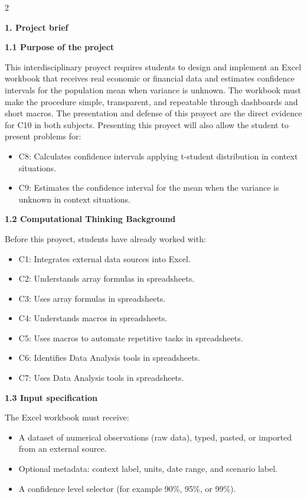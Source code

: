 \documentclass[12pt]{article}
\newcommand{\SubsectionBox}[1]{%
	\noindent\colorbox{gray!30}{%
		\parbox{\linewidth}{\textbf{#1}}%
	}\par\vspace{0.35cm}%
}
\begin{document}
	\vspace{0.4cm}
	
	\begin{multicols}{2}
		
		\vspace{0.25cm}
		\SubsectionBox{1. Project brief}\vspace{-0.25cm}
		
		\textbf{1.1 Purpose of the project}\par
		This interdisciplinary proyect requires students to design and implement an Excel workbook that receives real economic or financial data and estimates confidence intervals for the population mean when variance is unknown.
		The workbook must make the procedure simple, transparent, and repeatable through dashboards and short macros.
		The presentation and defense of this proyect are the direct evidence for C10 in both subjects.
		Presenting this proyect will also allow the student to present problems for:
		\begin{itemize}
			\item C8: Calculates confidence intervals applying t-student distribution in context situations.
			\item C9: Estimates the confidence interval for the mean when the variance is unknown in context situations.
		\end{itemize}
		
		\textbf{1.2 Computational Thinking Background}\par
		Before this proyect, students have already worked with:
		\begin{itemize}[noitemsep, topsep=0pt, parsep=0pt, partopsep=0pt]
			\item C1: Integrates external data sources into Excel.
			\item C2: Understands array formulas in spreadsheets.
			\item C3: Uses array formulas in spreadsheets.
			\item C4: Understands macros in spreadsheets.
			\item C5: Uses macros to automate repetitive tasks in spreadsheets.
			\item C6: Identifies Data Analysis tools in spreadsheets.
			\item C7: Uses Data Analysis tools in spreadsheets.
		\end{itemize}
		
		\textbf{1.3 Input specification}\par
		The Excel workbook must receive:
		\begin{itemize}
			\item A dataset of numerical observations (raw data), typed, pasted, or imported from an external source.
			\item Optional metadata: context label, units, date range, and scenario label.
			\item A confidence level selector (for example 90\%, 95\%, or 99\%).
		\end{itemize}
		

\end{multicols}
\end{document}
